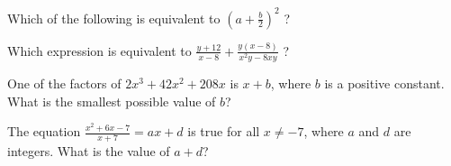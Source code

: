 \vspace{0.75em}



\vspace{2em}
\noindent\markforreview
\vspace{1em}

Which of the following is equivalent to \(\left(a+\frac{b}{2}\right)^2\) ?

\vspace{0.75em}


\newpage

\noindent\markforreview
\vspace{1em}

Which expression is equivalent to \(\frac{y + 12}{x - 8} + \frac{y(x - 8)}{x^2 y - 8xy}\) ?



\vspace{0.75em}



\vspace{2em}


\noindent\markforreview
\vspace{1em}

One of the factors of \(2x^3 + 42x^2 + 208x\) is \(x + b\),  
where \(b\) is a positive constant. What is the smallest possible value of \(b\)?

\vspace{0.75em}



\vspace{2em}

\noindent\markforreview
\vspace{1em}

The equation \(\frac{x^2 + 6x - 7}{x + 7} = ax + d\) is true for all \(x \ne -7\),  
where \(a\) and \(d\) are integers. What is the value of \(a + d\)?

\vspace{0.75em}



